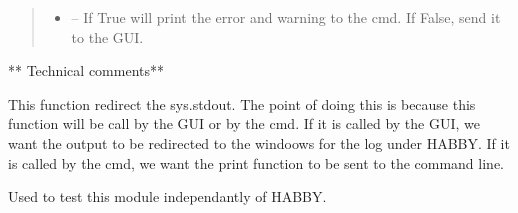 \documentclass[letterpaper,10pt,english]{sphinxmanual}
\begin{document}
\begin{fulllineitems}
\begin{quote}
\begin{description}
\begin{itemize}
\item {} 
 -- If True will print the error and warning to the cmd. If False, send it to the GUI.

\end{itemize}

\end{description}\end{quote}

** Technical comments**

This function redirect the sys.stdout. The point of doing this is because this function will be call by the GUI or
by the cmd. If it is called by the GUI, we want the output to be redirected to the windoows for the log under HABBY.
If it is called by the cmd, we want the print function to be sent to the command line.

\end{fulllineitems}


\begin{fulllineitems}
\label{\detokenize{index:src.hec_ras2D.main}}
Used to test this module independantly of HABBY.

\end{fulllineitems}

\end{document}
